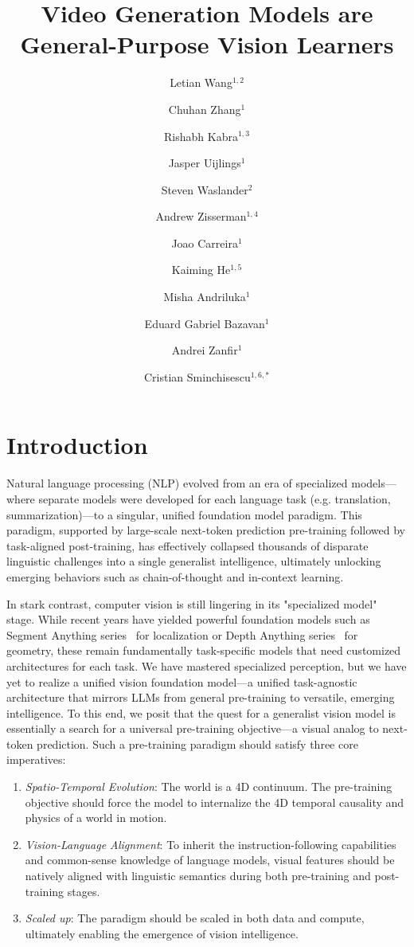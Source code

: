 \documentclass[11pt, a4paper, logo, onecolumn]{googledeepmind}
\title{Video Generation Models are General-Purpose Vision Learners}
\author[1]{Letian Wang$^{1,2}$}
\author[1]{Chuhan Zhang$^{1}$}
\author[1]{Rishabh Kabra$^{1,3}$}
\author[1]{Jasper Uijlings$^{1}$}
\author[1]{Steven Waslander$^{2}$}
\author[1]{Andrew Zisserman$^{1,4}$}
\author[1]{Joao Carreira$^{1}$}
\author[1]{Kaiming He$^{1,5}$}
\author[1]{Misha Andriluka$^{1}$}
\author[1]{Eduard Gabriel Bazavan$^{1}$}
\author[1]{Andrei Zanfir$^{1}$}
\author[1]{Cristian Sminchisescu$^{1,6,*}$}
\affil[1]{$^{1}$Google DeepMind}
\affil[2]{$^{2}$University of Toronto}
\affil[3]{$^{3}$University College London}
\affil[4]{$^{4}$University of Oxford}
\affil[5]{$^{5}$MIT}
\affil[6]{$^{6}$Lund University}
\begin{document}
\maketitle
\makeatletter
\fancyhead[C]{\fontsize{7}{8}\selectfont\@title}
\makeatother


\section{Introduction}
\label{sec:intro}
Natural language processing (NLP) evolved from an era of specialized models—where separate models were developed for each language task (e.g. translation, summarization)—to a singular, unified foundation model paradigm. This paradigm, supported by large-scale next-token prediction pre-training followed by task-aligned post-training, has effectively collapsed thousands of disparate linguistic challenges into a single generalist intelligence, ultimately unlocking emerging behaviors such as chain-of-thought and in-context learning.

In stark contrast, computer vision is still lingering in its "specialized model" stage. While recent years have yielded powerful foundation models such as Segment Anything series~\cite{kirillov2023segment,ravi2024sam,carion2025sam} for localization or Depth Anything series~\cite{yang2024depth,yang2025depth,lin2025depth} for geometry, these remain fundamentally task-specific models that need customized architectures for each task. We have mastered specialized perception, but we have yet to realize a unified vision foundation model—a unified task-agnostic architecture that mirrors LLMs from general pre-training to versatile, emerging intelligence.
To this end, we posit that the quest for a generalist vision model is essentially a search for a universal pre-training objective—a visual analog to next-token prediction. Such a pre-training paradigm should satisfy three core imperatives:
\begin{enumerate}[label=\arabic*)]
\item \textit{Spatio-Temporal Evolution}: The world is a 4D continuum. The pre-training objective should force the model to internalize the 4D temporal causality and physics of a world in motion.
\item \textit{Vision-Language Alignment}: To inherit the instruction-following capabilities and common-sense knowledge of language models, visual features should be natively aligned with linguistic semantics during both pre-training and post-training stages.
\item \textit{Scaled up}: The paradigm should be scaled in both data and compute, ultimately enabling the emergence of vision intelligence.
\end{enumerate}
\end{document}
